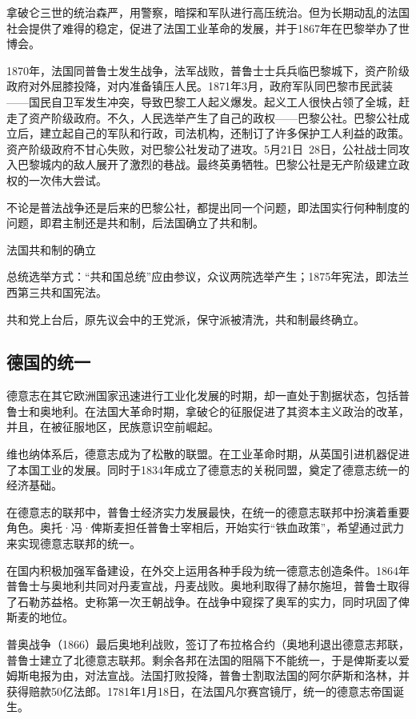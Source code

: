 拿破仑三世的统治森严，用警察，暗探和军队进行高压统治。但为长期动乱的法国社会提供了难得的稳定，促进了法国工业革命的发展，并于1867年在巴黎举办了世博会。

1870年，法国同普鲁士发生战争，法军战败，普鲁士士兵兵临巴黎城下，资产阶级政府对外屈膝投降，对内准备镇压人民。1871年3月，政府军队同巴黎市民武装——国民自卫军发生冲突，导致巴黎工人起义爆发。起义工人很快占领了全城，赶走了资产阶级政府。不久，人民选举产生了自己的政权——巴黎公社。巴黎公社成立后，建立起自己的军队和行政，司法机构，还制订了许多保护工人利益的政策。资产阶级政府不甘心失败，对巴黎公社发动了进攻。5月21日~28日，公社战士同攻入巴黎城内的敌人展开了激烈的巷战。最终英勇牺牲。巴黎公社是无产阶级建立政权的一次伟大尝试。

不论是普法战争还是后来的巴黎公社，都提出同一个问题，即法国实行何种制度的问题，即君主制还是共和制，后法国确立了共和制。

法国共和制的确立

总统选举方式：“共和国总统”应由参议，众议两院选举产生；1875年宪法，即法兰西第三共和国宪法。

共和党上台后，原先议会中的王党派，保守派被清洗，共和制最终确立。

\subsection{德国的统一}
德意志在其它欧洲国家迅速进行工业化发展的时期，却一直处于割据状态，包括普鲁士和奥地利。在法国大革命时期，拿破仑的征服促进了其资本主义政治的改革，并且，在被征服地区，民族意识空前崛起。

维也纳体系后，德意志成为了松散的联盟。在工业革命时期，从英国引进机器促进了本国工业的发展。同时于1834年成立了德意志的关税同盟，奠定了德意志统一的经济基础。

在德意志的联邦中，普鲁士经济实力发展最快，在统一的德意志联邦中扮演着重要角色。奥托·冯·俾斯麦担任普鲁士宰相后，开始实行“铁血政策”，希望通过武力来实现德意志联邦的统一。

在国内积极加强军备建设，在外交上运用各种手段为统一德意志创造条件。1864年普鲁士与奥地利共同对丹麦宣战，丹麦战败。奥地利取得了赫尔施坦，普鲁士取得了石勒苏益格。史称第一次王朝战争。在战争中窥探了奥军的实力，同时巩固了俾斯麦的地位。

普奥战争（1866）最后奥地利战败，签订了布拉格合约（奥地利退出德意志邦联，普鲁士建立了北德意志联邦。剩余各邦在法国的阻隔下不能统一，于是俾斯麦以爱姆斯电报为由，对法宣战。法国打败投降，普鲁士割取法国的阿尔萨斯和洛林，并获得赔款50亿法郎。1781年1月18日，在法国凡尔赛宫镜厅，统一的德意志帝国诞生。

